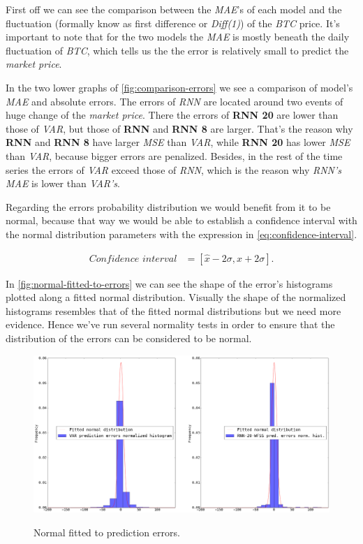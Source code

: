 First off we can see the comparison between the \textit{MAE}'s of each
model and the fluctuation (formally know as first difference or
\textit{Diff(1)}) of the \textit{BTC} price. It's important to note
that for the two models the \textit{MAE} is mostly beneath the daily
fluctuation of \textit{BTC}, which tells us the the error is
relatively small to predict the \textit{market price}.

In the two lower graphs of \autoref{fig:comparison-errors} we see a
comparison of model's \textit{MAE} and absolute errors. The errors of
\textit{RNN} are located around two events of huge change of the
\textit{market price}. There the errors of \textbf{RNN 20} are lower
than those of \textit{VAR}, but those of \textbf{RNN} and \textbf{RNN
8} are larger. That's the reason why \textbf{RNN} and \textbf{RNN 8}
have larger \textit{MSE} than \textit{VAR}, while \textbf{RNN 20} has
lower \textit{MSE} than \textit{VAR}, because bigger errors are
penalized. Besides, in the rest of the time series the errors of
\textit{VAR} exceed those of \textit{RNN}, which is the reason why
\textit{RNN's} \textit{MAE} is lower than \textit{VAR's}.

Regarding the errors probability distribution we would benefit from it
to be normal, because that way we would be able to establish a
confidence interval with the normal distribution parameters with the
expression in \autoref{eq:confidence-interval}.

\begin{equation}
  \begin{aligned}
    \label{eq:confidence-interval}
    \textit{Confidence interval} & =
    [ \hat{x} - 2 \sigma, \hat{x} + 2 \sigma ].
  \end{aligned}
\end{equation}

In \autoref{fig:normal-fitted-to-errors} we can see the shape of the
error's histograms plotted along a fitted normal distribution.
Visually the shape of the normalized histograms resembles that of the
fitted normal distributions but we need more evidence. Hence we've run
several normality tests in order to ensure that the distribution of
the errors can be considered to be normal.

\begin{figure}[bth]
  \myfloatalign
  {
    \includegraphics[width=1\linewidth]
    {gfx/normal-fitted-to-errors}}
  \caption{Normal fitted to prediction errors.}
  \label{fig:normal-fitted-to-errors}
\end{figure}

